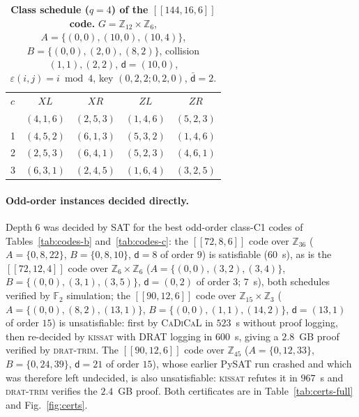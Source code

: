 \documentclass[reprint,twocolumn,superscriptaddress,nofootinbib]{revtex4-2}
\theoremstyle{plain}
\newcommand{\F}{\mathbb{F}_2}
\newcommand{\col}{\mathsf{d}}          %
\newcommand{\colbar}{\bar{\mathsf{d}}} %
\begin{document}
\begin{table}[!htbp]
\caption{\textbf{Class schedule ($q=4$) of the $[[144,16,6]]$ code.}
$G=\mathbb{Z}_{12}\times\mathbb{Z}_6$, $A=\{(0,0),(10,0),(10,4)\}$,
$B=\{(0,0),(2,0),(8,2)\}$, collision $(1,1),(2,2)$, $\col=(10,0)$,
$\varepsilon(i,j)=i\bmod4$, key $(0,2,2;0,2,0)$, $\colbar=2$.}
\label{tab:template144-16}
\begin{ruledtabular}
\begin{tabular}{lcccc}
$c$ & $XL$ & $XR$ & $ZL$ & $ZR$ \\
\colrule
0 & $(4,1,6)$ & $(2,5,3)$ & $(1,4,6)$ & $(5,2,3)$ \\
1 & $(4,5,2)$ & $(6,1,3)$ & $(5,3,2)$ & $(1,4,6)$ \\
2 & $(2,5,3)$ & $(6,4,1)$ & $(5,2,3)$ & $(4,6,1)$ \\
3 & $(6,3,1)$ & $(2,4,5)$ & $(1,6,4)$ & $(3,2,5)$ \\
\end{tabular}
\end{ruledtabular}
\end{table}

\paragraph*{Odd-order instances decided directly.}
Depth $6$ was decided by SAT for the best odd-order class-C1 codes of
Tables~\ref{tab:codes-b} and~\ref{tab:codes-c}: the $[[72,8,6]]$ code over
$\mathbb{Z}_{36}$ ($A=\{0,8,22\}$, $B=\{0,8,10\}$, $\col=8$ of order $9$)
is satisfiable ($60$~s), as is the $[[72,12,4]]$ code over
$\mathbb{Z}_6\times\mathbb{Z}_6$ ($A=\{(0,0),(3,2),(3,4)\}$,
$B=\{(0,0),(3,1),(3,5)\}$, $\col=(0,2)$ of order $3$; $7$~s), both
schedules verified by $\F$ simulation; the $[[90,12,6]]$ code over
$\mathbb{Z}_{15}\times\mathbb{Z}_3$ ($A=\{(0,0),(8,2),(13,1)\}$,
$B=\{(0,0),(1,1),(14,2)\}$, $\col=(13,1)$ of order $15$) is unsatisfiable:
first by \textsc{CaDiCaL} in $523$~s without proof logging, then re-decided
by \textsc{kissat} with DRAT logging in $600$~s, giving a $2.8$~GB proof
verified by \textsc{drat-trim}. The $[[90,12,6]]$ code over
$\mathbb{Z}_{45}$ ($A=\{0,12,33\}$, $B=\{0,24,39\}$, $\col=21$ of order
$15$), whose earlier PySAT run crashed and which was therefore left
undecided, is also unsatisfiable: \textsc{kissat} refutes it in $967$~s and
\textsc{drat-trim} verifies the $2.4$~GB proof. Both certificates are in
Table~\ref{tab:certs-full} and Fig.~\ref{fig:certs}.

\FloatBarrier
\end{document}
